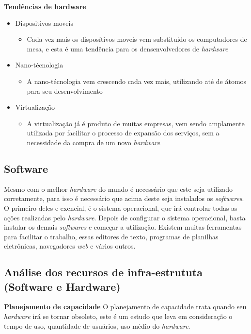 \documentclass[
	12pt,				%
	openany,			%
	a4paper,			%
	chapter=TITLE,		%
	section=TITLE,		%
	english,
	brazil				%
]{abntex2}
\begin{document}
\begin{itemize}
\begin{itemize}
\begin{itemize}
	\textbf{Tendências de hardware}
		\begin{itemize}
			\item Dispositivos moveis
				\begin{itemize}
					\item[] Cada vez mais os disposítivos moveis vem substituido os computadores de mesa, e esta é uma tendência para os densenvolvedores de \textit{hardware}
				\end{itemize}
			\item Nano-técnologia
				\begin{itemize}
					\item[] A nano-técnologia vem crescendo cada vez mais, utilizando até de átomos para seu desenvolvimento
				\end{itemize}
			\item Virtualização
				\begin{itemize}
					\item[] A virtualização já é produto de muitas empresas, vem sendo amplamente utilizada por facilitar o processo de expansão dos serviços, sem a necessidade da compra de um novo \textit{hardware}
				\end{itemize}
		\end{itemize}


	\subsection{Software}
	Mesmo com o melhor \textit{hardware} do mundo é necessário que este seja utilizado corretamente, para isso é necessário que acima deste seja instalados os \textit{softwares}. O primeiro deles e exencial, é o sistema operacional, que irá controlar todas as ações realizadas pelo \textit{hardware}.
	Depois de configurar o sistema operacional, basta instalar os demais \textit{softwares} e começar a utilização. Existem muitas ferramentas para facilitar o trabalho, essas editores de texto, programas de planilhas eletrônicas, navegadores \textit{web} e vários outros.

	\subsection{Análise dos recursos de infra-estrututa (Software e Hardware)}
	\textbf{Planejamento de capacidade}
		O planejamento de capacidade trata quando seu \textit{hardware} irá se tornar obsoleto, este é um estudo que leva em consideração o tempo de uso, quantidade de usuários, uso médio do \textit{hardware}.


\end{itemize}
\end{itemize}
\end{itemize}
\end{document}
